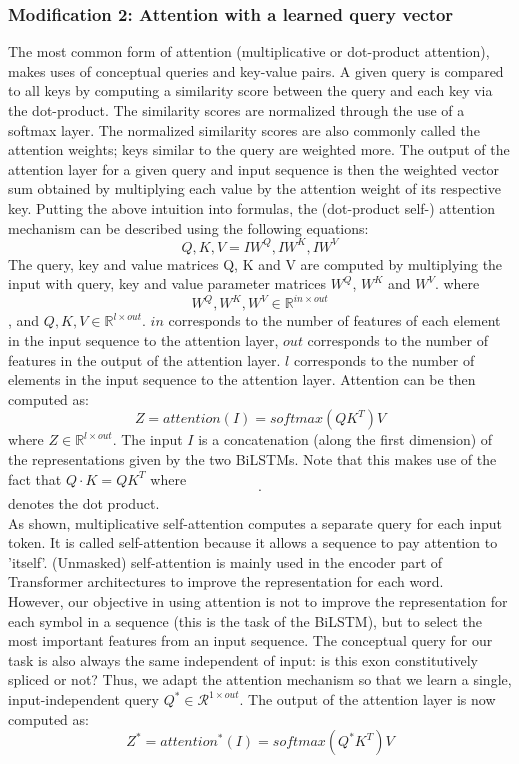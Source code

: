 \subsubsection{Modification 2: Attention with a learned query vector}
The most common form of attention (multiplicative or dot-product attention), makes uses of conceptual queries and key-value pairs. A given query is compared to all keys by computing a similarity score between the query and each key via the dot-product. The similarity scores are normalized through the use of a softmax layer. The normalized similarity scores are also commonly called the attention weights; keys similar to the query are weighted more. The output of the attention layer for a given query and input sequence is then the weighted vector sum obtained by multiplying each value by the attention weight of its respective key.
Putting the above intuition into formulas, the (dot-product self-) attention mechanism can be described using the following equations:
$$Q, K, V = IW^Q, IW^K, IW^V$$
The query, key and value matrices Q, K and V are computed by multiplying the input with query, key and value parameter matrices $W^Q$, $W^K$ and $W^V$.
where $$W^Q,W^K, W^V \in \mathbb{R}^{in \times out}$$,
and $Q,K, V \in \mathbb{R}^{l \times out}$. $in$ corresponds to the number of features of each element in the input sequence to the attention layer, $out$ corresponds to the number of features in the output of the attention layer. $l$ corresponds to the number of elements in the input sequence to the attention layer.
Attention can be then computed as:
$$Z = attention(I) = softmax(QK^T)V$$
where $Z \in \mathbb{R}^{l \times out}$. The input $I$ is a concatenation (along the first dimension) of the representations given by the two BiLSTMs.
Note that this makes use of the fact that $Q\cdotp K = QK^T$ where $$\cdotp$$ denotes the dot product.\\
As shown, multiplicative self-attention computes a separate query for each input token. It is called self-attention because it allows a sequence to pay attention to 'itself'. (Unmasked) self-attention is mainly used in the encoder part of Transformer architectures to improve the representation for each word.\\
However, our objective in using attention is not to improve the representation for each symbol in a sequence (this is the task of the BiLSTM), but to select the most important features from an input sequence. The conceptual query for our task is also always the same independent of input: is this exon constitutively spliced or not?
Thus, we adapt the attention mechanism so that we learn a single, input-independent query ${Q}^* \in \mathcal{R}^{1 \times out}$. The output of the attention layer is now computed as:
$$Z^* = {attention}^*(I) = softmax({Q}^*K^T)V$$


